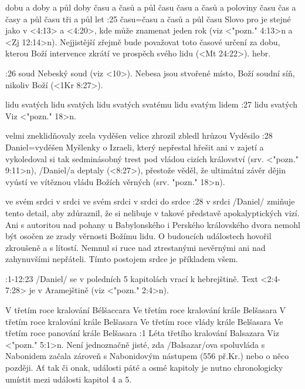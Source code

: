    {dobu a doby a půl doby}   %
   {času a časů a půl času}   %
   {času a časů a poloviny času}   %
   {čas a časy a půl času}   %
   {tři a půl let}   %
:25 {času}={času a časů a půl času} Slovo pro  je stejné jako v <4:13> a <4:20>, kde může znamenat jeden rok (viz <"pozn." 4:13>n a <Zj 12:14>n). Nejjistější zřejmě bude považovat toto časové určení za dobu, kterou  Boží intervence zkrátí ve prospěch svého lidu (<Mt 24:22>).
\dopsat hebr.

:26 {soud} Nebeský soud (viz <10>). Nebesa jsou stvořené místo, Boží soudní síň, nikoliv Boží  (<1Kr 8:27>). 

    {lidu svatých} %
    {lidu svatých}  %
    {lidu svatých} %
    {svatému lidu}  %
    {svatým lidem}  %
:27 {lidu svatých} Viz  <"pozn." 18>n.

    {velmi zneklidňovaly} %
    {zcela vyděšen}  %
    {velice zhrozil} %
    {zbledl hrůzou}  %
    {Vyděsilo}  %
:28 {Daniel}={vyděšen} Myšlenky o Izraeli, který nepřestal hřešit ani v zajetí a vykoledoval si tak sedminásobný trest pod vládou cizích království   (srv. <"pozn." 9:11>n), \x/Daniel/a deptaly (<8:27>), přestože věděl, že ultimátní závěr dějin vyústí ve vítěznou vládu Božích věrných  (srv. \<"pozn." 18>n).

   {ve svém srdci}   %
   {v srdci}   %
   {ve svém srdci}   %
   {v srdci}   %
   {do srdce}   %
 :28 {v srdci} \x/Daniel/ zmiňuje tento detail, aby zdůraznil, že si nelibuje v takové představě apokalyptických vizí.  Ani s autoritou nad pohany u Babylonského i Perského královského dvora nemohl být osočen ze zrady věrnosti Božímu lidu. O budoucích událostech hovořil zkroušeně a s lítostí. Nemnul si ruce nad ztrestanými nevěrnými ani nad zahynuvšími nepřáteli. Tímto postojem srdce je příkladem všem.
 
:1-12:23 {} \x/Daniel/ se v poledních 5 kapitolách vrací k hebrejštině. Text <2:4-7:28>
je v Aramejštině (viz <"pozn." 2:4>n).
   
   {V třetím roce kralování Bélšaccara}   %
   {Ve třetím roce kralování krále Belšasara}   %
   {V třetím roce kralování krále Belšasara}   %
   {Ve třetím roce vlády krále Belšasara}   %
   {Ve třetím roce panování krále Belšasara}   %
:1 {Léta třetího kralování Balsazara}
     Viz <"pozn." 5:1>n. Není jednoznačně jisté, zda \x/Balsazar/ova
     spoluvláda s Nabonidem začala zároveň s Nabonidovým nástupem (556 př.Kr.) nebo o něco
     později. Ať tak či onak, události páté a osmé kapitoly je nutno chronologicky umístit
     mezi události kapitol 4 a 5. 


